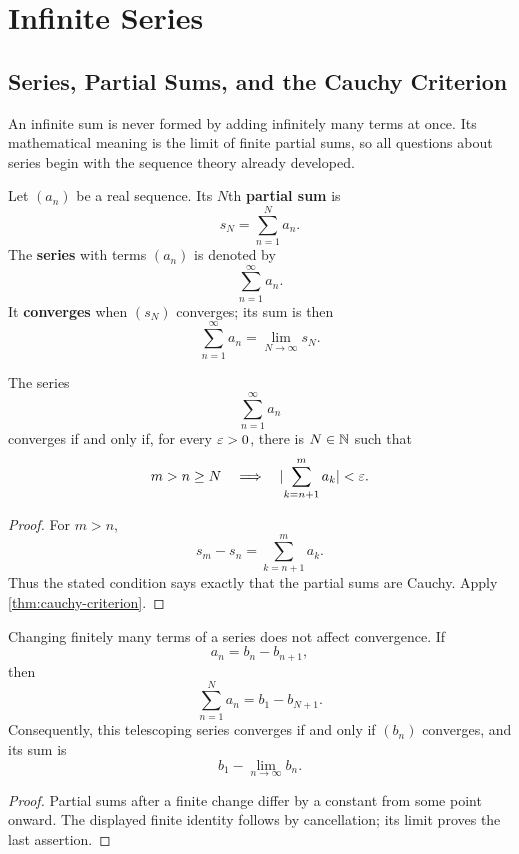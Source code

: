 \chapter{Infinite Series}
\label{ch:series}

\section{Series, Partial Sums, and the Cauchy Criterion}

An infinite sum is never formed by adding infinitely many terms at once.
Its mathematical meaning is the limit of finite partial sums, so all
questions about series begin with the sequence theory already developed.

\begin{definition}[Series]
Let $(a_n)$ be a real sequence. Its $N$th \textbf{partial sum} is
\[
s_N=\sum_{n=1}^{N}a_n.
\]
The \textbf{series} with terms $(a_n)$ is denoted by
\[
\sum_{n=1}^{\infty}a_n.
\]
It \textbf{converges} when $(s_N)$ converges; its sum is then
\[
\sum_{n=1}^{\infty}a_n=\lim_{N\to\infty}s_N.
\]
\end{definition}

\begin{theorem}
\label{thm:series-cauchy}
The series
\[
\sum_{n=1}^{\infty}a_n
\]
converges if and only if, for every $\varepsilon>0$, there is $N\in\mathbb{N}$ such that
\[
m>n\geq N
\quad\Longrightarrow\quad
\lvert \sum_{k=n+1}^{m}a_k\rvert<\varepsilon.
\]
\end{theorem}
\begin{proof}
For $m>n$,
\[
s_m-s_n=\sum_{k=n+1}^{m}a_k.
\]
Thus the stated condition says exactly that the partial sums are Cauchy. Apply \cref{thm:cauchy-criterion}.
\end{proof}

\begin{proposition}
\label{prop:finite-changes-telescoping}
Changing finitely many terms of a series does not affect convergence. If
\[
a_n=b_n-b_{n+1},
\]
then
\[
\sum_{n=1}^{N}a_n=b_1-b_{N+1}.
\]
Consequently, this telescoping series converges if and only if $(b_n)$ converges, and its sum is
\[
b_1-\lim_{n\to\infty}b_n.
\]
\end{proposition}
\begin{proof}
Partial sums after a finite change differ by a constant from some point onward. The displayed finite identity follows by cancellation; its limit proves the last assertion.
\end{proof}

